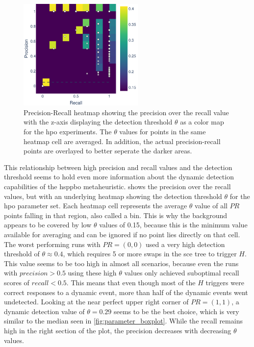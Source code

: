 \begin{figure}[h]
	\centering
	\includegraphics[width=0.55\textwidth]{results/part3/pr_curve_cmp_detection_threshold_grouped_True_HPO.svg}
	\caption[Precision-Recall heatmap showing the precision over the recall value with the z-axis displaying the detection threshold $\theta$ for the \gls{hpo} experiments]{Precision-Recall heatmap showing the precision over the recall value with the z-axis displaying the detection threshold $\theta$ as a color map for the \gls{hpo} experiments. The $\theta$ values for points in the same heatmap cell are averaged. In addition, the actual precision-recall points are overlayed to better seperate the darker areas.}
	\label{fig:pr_curve_cmp_detection_threshold}
\end{figure}

This relationship between high precision and recall values and the detection threshold seems to hold even more information about the dynamic detection capabilities of the \gls{hsppbo} metaheuristic.  shows the precision over the recall values, but with an underlying heatmap showing the detection threshold $\theta$ for the \gls{hpo} parameter set. Each heatmap cell represents the average $\theta$ value of all $PR$ points falling in that region, also called a bin. This is why the background appears to be covered by low $\theta$ values of 0.15, because this is the minimum value available for averaging and can be ignored if no point lies directly on that cell.
The worst performing runs with $PR = (0,0)$ used a very high detection threshold of $\theta \approx 0.4$, which requires 5 or more swaps in the \gls{sce} tree to trigger $H$. This value seems to be too high in almost all scenarios, because even the runs with $precision > 0.5$ using these high $\theta$ values only achieved suboptimal recall scores of $recall < 0.5$. This means that even though most of the $H$ triggers were correct responses to a dynamic event, more than half of the dynamic events went undetected. Looking at the near perfect upper right corner of $PR=(1,1)$, a dynamic detection value of $\theta = 0.29$ seems to be the best choice, which is very similar to the median seen in \cref{fig:parameter_boxplot}. While the recall remains high in the right section of the plot, the precision decreases with decreasing $\theta$ values.

